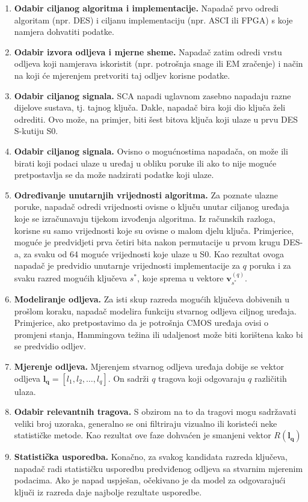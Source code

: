 \documentclass[times, utf8, diplomski]{fer}
\begin{document}
\begin{enumerate}
    \item{\textbf{Odabir ciljanog algoritma i implementacije.}} Napadač prvo odredi algoritam (npr. DES) i ciljanu implementaciju (npr. ASCI ili FPGA) s koje namjera dohvatiti podatke.
    \item{\textbf{Odabir izvora odljeva i mjerne sheme.}} Napadač zatim odredi vrstu odljeva koji namjerava iskoristit (npr. potrošnja snage ili EM zračenje) i način na koji će mjerenjem pretvoriti taj odljev korisne podatke.
    \item{\textbf{Odabir ciljanog signala.}} SCA napadi uglavnom zasebno napadaju razne dijelove sustava, tj. tajnog ključa. Dakle, napadač bira koji dio ključa želi odrediti. Ovo može, na primjer, biti šest bitova ključa koji ulaze u prvu DES S-kutiju S0.
    \item{\textbf{Odabir ciljanog signala.}} Ovisno o mogućnostima napadača, on može ili birati koji podaci ulaze u uređaj u obliku poruke ili ako to nije moguće pretpostavlja se da može nadzirati podatke koji ulaze.
    \item{\textbf{Određivanje unutarnjih vrijednosti algoritma.}} Za poznate ulazne poruke, napadač odredi vrijednosti ovisne o ključu unutar ciljanog uređaja koje se izračunavaju tijekom izvođenja algoritma. Iz računskih razloga, korisne su samo vrijednosti koje su ovisne o malom djelu ključa. Primjerice, moguće je predvidjeti prva četiri bita nakon permutacije u prvom krugu DES-a, za svaku od 64 moguće vrijednosti koje ulaze u S0. Kao rezultat ovoga napadač je predvidio unutarnje vrijednosti implementacije za $q$ poruka i za svaku razred mogućih ključeva $s^*$, koje sprema u vektore $\bm{v}_{s^*}^{(q)}$.
    \item{\textbf{Modeliranje odljeva.}} Za isti skup razreda mogućih ključeva dobivenih u prošlom koraku, napadač modelira funkciju stvarnog odljeva ciljnog uređaja. Primjerice, ako pretpostavimo da je potrošnja CMOS uređaja ovisi o promjeni stanja, Hammingova težina ili udaljenost može biti korištena kako bi se predvidio odljev.
    \item{\textbf{Mjerenje odljeva.}} Mjerenjem stvarnog odljeva uređaja dobije se vektor odljeva $\bm{l_q} = \left[ l_1, l_2, \dots, l_q \right]$. On sadrži $q$ tragova koji odgovaraju $q$ različitih ulaza.
    \item{\textbf{Odabir relevantnih tragova.}} S obzirom na to da tragovi mogu sadržavati veliki broj uzoraka, generalno se oni filtriraju vizualno ili koristeći neke statističke metode. Kao rezultat ove faze dohvaćen je smanjeni vektor $R(\bm{l_q})$
    \item{\textbf{Statistička usporedba.}} Konačno, za svakog kandidata razreda ključeva, napadač radi statističku usporedbu predviđenog odljeva sa stvarnim mjerenim podacima. Ako je napad uspješan, očekivano je da model za odgovarajući ključi iz razreda daje najbolje rezultate usporedbe.
\end{enumerate}
\end{document}
